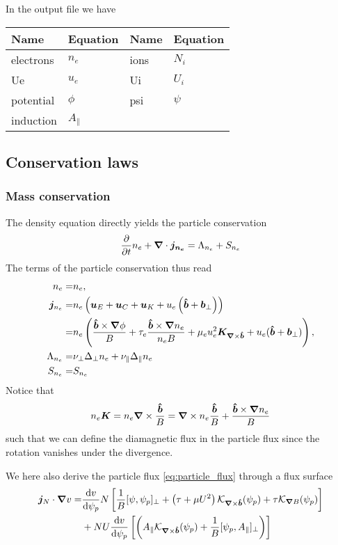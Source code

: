In the output file we have
\begin{longtable}{llll}
\toprule
\rowcolor{gray!50}\textbf{Name} &  \textbf{Equation} & \textbf{Name} &  \textbf{Equation}\\
\midrule
    electrons &$n_e$ &
    ions &$N_i$ \\
    Ue &$u_e$ &
    Ui &$U_i$ \\
    potential &$\phi$ &
    psi &$\psi$ \\
    induction &$A_\parallel$ & \\
\bottomrule
\end{longtable}
\subsection{Conservation laws} \label{sec:conservation}
\subsubsection{Mass conservation}
The density equation directly yields the particle conservation
\begin{align} \label{eq:mass_theorem}
  \frac{\partial}{\partial t} n_e
  + {\boldsymbol{\nabla}}\cdot{\boldsymbol{ j_{n_e}}}
  =  \Lambda_{n_e}+S_{n_e}
\end{align}
The terms of the particle conservation thus read
\begin{align}
  n_e= & n_e,\\
  {\boldsymbol{j}}_{n_e} =& n_e\left(
  {\boldsymbol{u}}_E + {\boldsymbol{u}}_C + {\boldsymbol{u}}_{K} +u_e\left(\bm{\hat{b}}+{{\boldsymbol{b}}}_\perp\right)  \right) \nonumber\\
  =& n_e \left(\frac{\bm{\hat{b}}\times {\boldsymbol{\nabla}}\phi}{B} 
  + \tau_e \frac{\bm{\hat{b}}\times{\boldsymbol{\nabla}} n_e}{n_eB} 
  + \mu_e u_e^2{\boldsymbol{K}}_{{\boldsymbol{\nabla}}\times\bm{\hat{b}}} 
  + u_e(\bm{\hat{b}} + {{\boldsymbol{b}}}_\perp) \right), \label{eq:particle_flux} \\
  \Lambda_{n_e} =&
  \nu_\perp\Delta_\perp n_e + \nu_\parallel\Delta_\parallel n_e
\\
  S_{n_e} =&  S_{n_e}
\end{align}
Notice that
\begin{align}
n_e {\boldsymbol{K}} = n_e{\boldsymbol{\nabla}}\times\frac{\bm{\hat{b}}}{B} = {\boldsymbol{\nabla}}\times n_e\frac{\bm{\hat{b}}}{B} + \frac{\bm{\hat{b}}\times{\boldsymbol{\nabla}} n_e}{B}
\label{}
\end{align}
such that we can define the diamagnetic flux in the particle flux since
the rotation vanishes under the divergence.

We here also derive the particle flux \eqref{eq:particle_flux} through a flux surface
\begin{align} \label{eq:radial_particle_flux}
 \vec j_{N}\cn v %
 =&
  \frac{\d v}{\d \psi_p} N\left[\frac{1}{B}[\psi, \psi_p]_\perp + \left(\tau + \mu U^2\right)
   \mathcal K_{\vn\times\bhat}(\psi_p) + \tau  \mathcal K_{\vn B}(\psi_p) \right] \nonumber\\
 &+ NU\frac{\d v}{\d \psi_p}\left [\left( A_\parallel \mathcal
 K_{\vn\times\bhat}(\psi_p) + \frac{1}{B}[\psi_p, A_\parallel]_\perp\right) \right]
\end{align}

